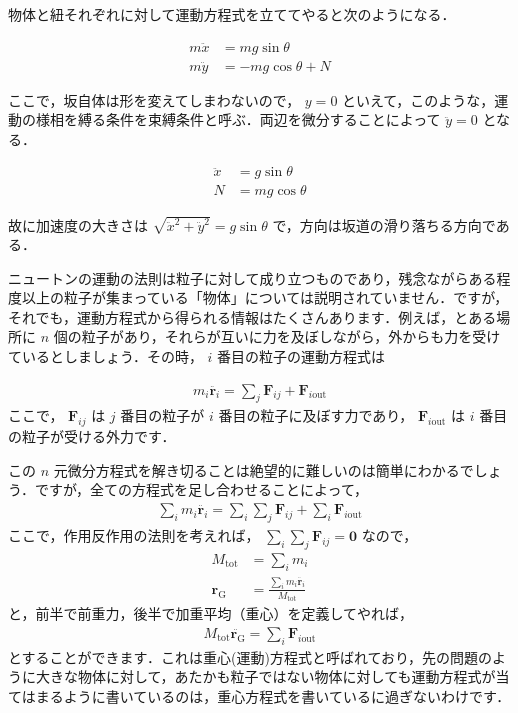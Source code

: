 \documentclass[
  b4paperpaper,
  xelatex,ja=standard]{bxjsbook}
\begin{document}
物体と紐それぞれに対して運動方程式を立ててやると次のようになる．

\begin{align*}
m\ddot{x} &= mg \sin \theta \\
m\ddot{y} &= -mg \cos \theta + N
\end{align*}

ここで，坂自体は形を変えてしまわないので， \(y=0\)
といえて，このような，運動の様相を縛る条件を束縛条件と呼ぶ．両辺を微分することによって
\(\ddot{y}=0\) となる．

\begin{align*}
\ddot{x} &= g \sin \theta \\
N &= mg \cos \theta
\end{align*}

故に加速度の大きさは \(\sqrt{\ddot{x}^2+\ddot{y}^2}=g \sin \theta\)
で，方向は坂道の滑り落ちる方向である．

ニュートンの運動の法則は粒子に対して成り立つものであり，残念ながらある程度以上の粒子が集まっている「物体」については説明されていません．ですが，それでも，運動方程式から得られる情報はたくさんあります．例えば，とある場所に
\(n\)
個の粒子があり，それらが互いに力を及ぼしながら，外からも力を受けているとしましょう．その時，
\(i\) 番目の粒子の運動方程式は

\begin{align*}
m_i\ddot{\boldsymbol{r}_i} = \sum_j \boldsymbol{F}_{ij} +  \boldsymbol{F}_{i\text{out}}
\end{align*} ここで， \(\boldsymbol{F}_{ij}\) は \(j\) 番目の粒子が
\(i\) 番目の粒子に及ぼす力であり， \(\boldsymbol{F}_{i\text{out}}\) は
\(i\) 番目の粒子が受ける外力です．

この \(n\)
元微分方程式を解き切ることは絶望的に難しいのは簡単にわかるでしょう．ですが，全ての方程式を足し合わせることによって，
\begin{align*}
\sum_i m_i\ddot{\boldsymbol{r}_i} = \sum_i\sum_j \boldsymbol{F}_{ij} +  \sum_i\boldsymbol{F}_{i\text{out}}
\end{align*} ここで，作用反作用の法則を考えれば，
\(\sum_i\sum_j \boldsymbol{F}_{ij}=\boldsymbol{0}\) なので，
\begin{align*}
M_{\text{tot}}&=\sum_i m_i \\
\boldsymbol{r}_\text{G}&=\frac{\sum_i m_i\ddot{\boldsymbol{r}_i}}{M_{\text{tot}}}
\end{align*} と，前半で前重力，後半で加重平均（重心）を定義してやれば，
\begin{align*}
M_{\text{tot}}\ddot{\boldsymbol{r}_\text{G}} = \sum_i\boldsymbol{F}_{i\text{out}}
\end{align*}
とすることができます．これは重心(運動)方程式と呼ばれており，先の問題のように大きな物体に対して，あたかも粒子ではない物体に対しても運動方程式が当てはまるように書いているのは，重心方程式を書いているに過ぎないわけです．
\end{document}
